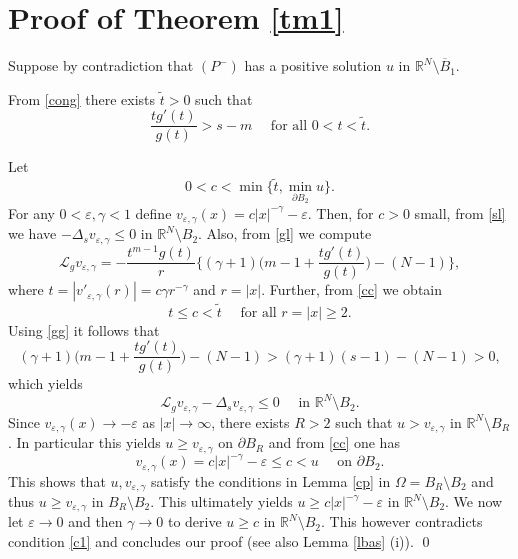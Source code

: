 \documentclass[leqno,12pt]{article}
\numberwithin{equation}{section}
\newcommand{\R}{\mathbb R}
\newcommand{\Ro}{\mathbb R^N\setminus \overline B_1}
\newcommand{\Lg}{{\mathcal L}_g}
\begin{document}
\section{Proof of Theorem \ref{tm1}}

Suppose by contradiction that $(P^-)$ has a positive solution $u$ in $\Ro$.

From \eqref{cong} there exists $\tilde t>0$ such that 
\begin{equation}\label{gg}
\frac{tg'(t)}{g(t)}>s-m\quad\mbox{ for all }0<t<\widetilde t.
\end{equation}

Let 
\begin{equation}\label{cc}
0<c<\min\Big\{\tilde t, \min_{\partial B_{2}}u\Big\}.
\end{equation}
For any $0<\varepsilon, \gamma<1$ define $v_{\varepsilon, \gamma}(x)=c|x|^{-\gamma}-\varepsilon$. Then, for $c>0$ small, from \eqref{sl} we have $-\Delta_s v_{\varepsilon, \gamma}\leq 0$ in $\R^N\setminus B_{2}$. Also, from \eqref{gl}  we compute
$$
\Lg v_{\varepsilon, \gamma}=-\frac{t^{m-1}g(t)}{r}\Big\{(\gamma+1)\Big(m-1+\frac{tg'(t)}{g(t)}\Big)-(N-1)\Big\},
$$
where $t=|v'_{\varepsilon, \gamma}(r)|=c\gamma r^{-\gamma}$ and $r=|x|$. Further, from \eqref{cc} we obtain
$$
t\leq c<\tilde t \quad\mbox{ for all }r=|x|\geq 2.
$$
Using \eqref{gg} it follows that 
$$
(\gamma+1)\Big(m-1+\frac{tg'(t)}{g(t)}\Big)-(N-1)> (\gamma+1)(s-1)-(N-1)>0,
$$
which yields 
\begin{equation}\label{cc1}
\Lg v_{\varepsilon, \gamma}-\Delta_s v_{\varepsilon, \gamma}\leq 0\quad\mbox{ in }\R^N\setminus B_{2}.
\end{equation} 
Since $v_{\varepsilon, \gamma}(x)\to -\varepsilon$ as $|x|\to \infty$, there exists $R>2$ such that $u>v_{\varepsilon, \gamma}$ in $\R^N\setminus B_R$. In particular this yields $u\geq v_{\varepsilon, \gamma}$ on $\partial B_R$ and from \eqref{cc} one has 
$$
v_{\varepsilon, \gamma}(x)=c|x|^{-\gamma}-\varepsilon\leq c<u \quad\mbox{ on }\partial B_{2}.
$$
This shows that $u, v_{\varepsilon, \gamma}$ satisfy the conditions in Lemma \ref{cp} in $\Omega=B_R\setminus B_{2}$ and thus $u\geq v_{\varepsilon, \gamma}$ in $B_R\setminus B_{2}$. This ultimately yields $u\geq c|x|^{-\gamma}-\varepsilon$ in $\R^N\setminus B_{2}$. We now let $\varepsilon\to 0$ and then $\gamma\to 0$ to derive $u\geq c$ in $\R^N\setminus B_{2}$. This however contradicts  condition \eqref{c1} and concludes our proof (see also Lemma \ref{lbas} (i)).
\qed
\end{document}
